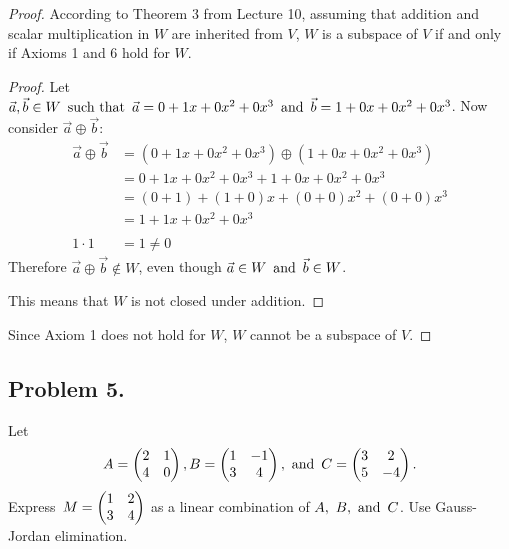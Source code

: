 \documentclass{article}
\begin{document}
\begin{proof}
    According to Theorem 3 from Lecture 10, assuming that addition and scalar multiplication in $W$ are inherited from $V$, $W$ is a subspace of $V$ if and only if Axioms 1 and 6 hold for $W$.
    \begin{enumerate}
        \begin{proof}
            Let $\vec{a}, \vec{b} \in W \operatorname{~\text{such that}~} \vec{a} = 0 + 1x + 0x^2 + 0x^3 \operatorname{~\text{and}~} \vec{b} = 1 + 0x + 0x^2 + 0x^3$. Now consider $\vec{a} \oplus \vec{b}$:
            \begin{align*}
                \vec{a} \oplus \vec{b} & = (0 + 1x + 0x^2 + 0x^3) \oplus (1 + 0x + 0x^2 + 0x^3) \\
                                       & = 0 + 1x + 0x^2 + 0x^3 + 1 + 0x + 0x^2 + 0x^3          \\
                                       & = (0+1) + (1+0)x + (0+0)x^2 + (0+0)x^3                 \\
                                       & = 1 + 1x + 0x^2 + 0x^3                                 \\ \\
                1 \cdot 1              & = 1 \neq 0
            \end{align*}
            Therefore $\vec{a} \oplus \vec{b} \not \in W$, even though $\vec{a} \in W \operatorname{~\text{and}~} \vec{b} \in W$.

            This means that $W$ is not closed under addition.
        \end{proof}
    \end{enumerate}
    Since Axiom 1 does not hold for $W$, $W$ cannot be a subspace of $V$.
\end{proof}

\newpage

\subsection*{Problem 5.}
Let
\[
    A = \begin{pmatrix}2 & 1 \\ 4 & 0\end{pmatrix}, B = \begin{pmatrix}1 & -1 \\ 3 & 4\end{pmatrix}, \operatorname{~\text{and}~} C = \begin{pmatrix}3 & 2  \\ 5 & -4\end{pmatrix}.
\]
Express $\operatorname{\displaystyle} M = \begin{pmatrix}1 & 2 \\ 3 & 4\end{pmatrix}$ as a linear combination of $A,~B,\operatorname{~\text{and}~} C$. Use Gauss-Jordan elimination.
\end{document}
